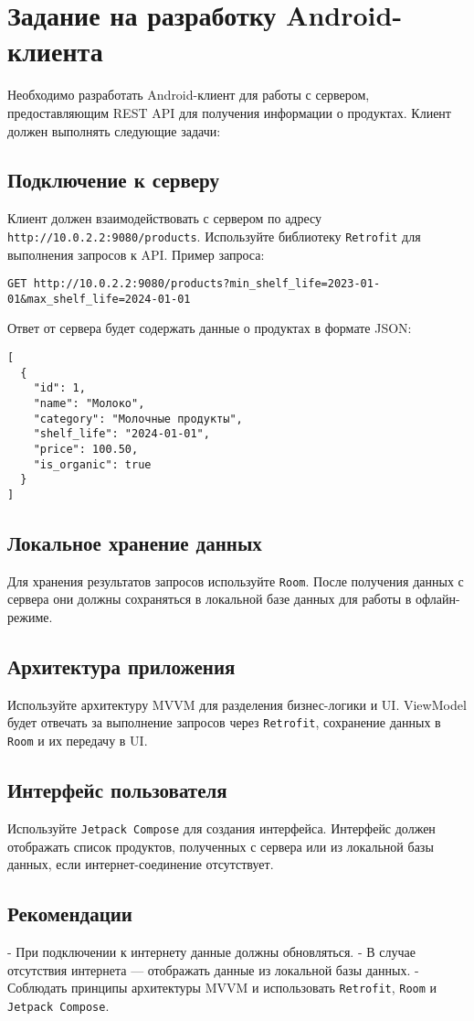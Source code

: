 \section{Задание на разработку Android-клиента}

Необходимо разработать Android-клиент для работы с сервером, предоставляющим REST API для получения информации о продуктах. Клиент должен выполнять следующие задачи:

\subsection{Подключение к серверу}
Клиент должен взаимодействовать с сервером по адресу \texttt{http://10.0.2.2:9080/products}. Используйте библиотеку \texttt{Retrofit} для выполнения запросов к API. Пример запроса:

\begin{verbatim}
GET http://10.0.2.2:9080/products?min_shelf_life=2023-01-01&max_shelf_life=2024-01-01
\end{verbatim}

Ответ от сервера будет содержать данные о продуктах в формате JSON:

\begin{verbatim}
[
  {
    "id": 1,
    "name": "Молоко",
    "category": "Молочные продукты",
    "shelf_life": "2024-01-01",
    "price": 100.50,
    "is_organic": true
  }
]
\end{verbatim}

\subsection{Локальное хранение данных}
Для хранения результатов запросов используйте \texttt{Room}. После получения данных с сервера они должны сохраняться в локальной базе данных для работы в офлайн-режиме.

\subsection{Архитектура приложения}
Используйте архитектуру MVVM для разделения бизнес-логики и UI. ViewModel будет отвечать за выполнение запросов через \texttt{Retrofit}, сохранение данных в \texttt{Room} и их передачу в UI.

\subsection{Интерфейс пользователя}
Используйте \texttt{Jetpack Compose} для создания интерфейса. Интерфейс должен отображать список продуктов, полученных с сервера или из локальной базы данных, если интернет-соединение отсутствует.

\subsection{Рекомендации}
- При подключении к интернету данные должны обновляться.
- В случае отсутствия интернета — отображать данные из локальной базы данных.
- Соблюдать принципы архитектуры MVVM и использовать \texttt{Retrofit}, \texttt{Room} и \texttt{Jetpack Compose}.
